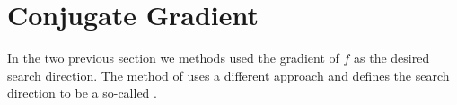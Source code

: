 \section{Conjugate Gradient\label{sec:conjugate_gradient}}
    In the two previous section we methods used the gradient of $f$ as the
    desired search direction. The method of  uses a
    different approach and defines the search direction to be a so-called
    .



